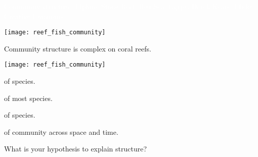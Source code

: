 \documentclass[t,handout]{beamer}  %
\begin{document}
{
\begin{frame}[b]{\textcolor{white}{Community structure.}}
\tiny\textcolor{white}{Elphine Stone Reef, Red Sea, Egypt. Derek Keats, Flickr, Creative Commons.}
\end{frame}
}


\begin{frame}[t]{}

\begin{multicols}{2}
	{\centering
	\texttt{[image: reef\_fish\_community]}\par}
\columnbreak
	
	\hangpara{}
	
	\hangpara{}
	
	\hangpara{}
	
	\hangpara{}
	
	\hangpara{}\newline {}
	
	\hangpara {} 
\end{multicols}

\end{frame}


\begin{frame}[t]{Community structure is complex on coral reefs.}

\begin{multicols}{2}
	{\centering
	\texttt{[image: reef\_fish\_community]}\par}
\columnbreak
	
	\hangpara{} of species.
	
	\hangpara{} of most species.
	
	\hangpara{} of species.
	
	\hangpara{}
	
	\hangpara{} of community across space and time.
	
	\hangpara What is your hypothesis to explain structure?
\end{multicols}

\end{frame}
\end{document}
